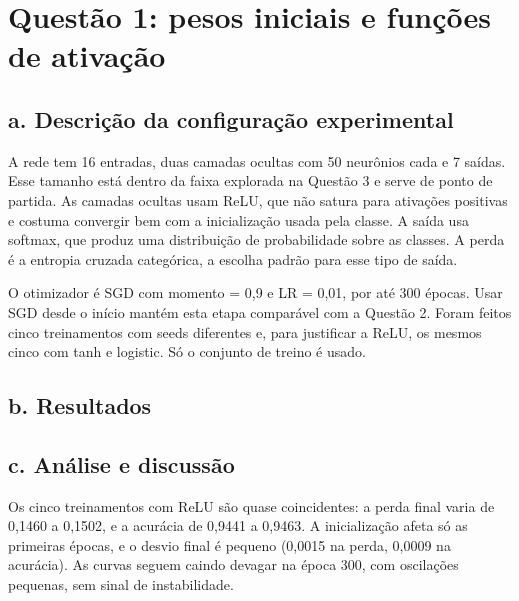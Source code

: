 \section{Questão 1: pesos iniciais e funções de ativação}

\subsection*{a. Descrição da configuração experimental}

A rede tem 16 entradas, duas camadas ocultas com 50 neurônios cada e 7 saídas. Esse tamanho está dentro da faixa
explorada na Questão 3 e serve de ponto de partida. As camadas ocultas usam ReLU, que não satura para ativações positivas
e costuma convergir bem com a inicialização usada pela classe. A saída usa softmax, que produz uma distribuição de
probabilidade sobre as classes. A perda é a entropia cruzada categórica, a escolha padrão para esse tipo de saída.

O otimizador é SGD com momento = 0,9 e LR = 0,01, por até 300 épocas. Usar SGD desde o início mantém esta etapa comparável
com a Questão 2. Foram feitos cinco treinamentos com seeds diferentes e, para justificar a ReLU, os mesmos cinco com tanh e
logistic. Só o conjunto de treino é usado.

\subsection*{b. Resultados}


\subsection*{c. Análise e discussão}

Os cinco treinamentos com ReLU são quase coincidentes: a perda final varia de 0,1460 a 0,1502, e a acurácia de 0,9441 a
0,9463. A inicialização afeta só as primeiras épocas, e o desvio final é pequeno (0,0015 na perda, 0,0009 na acurácia).
As curvas seguem caindo devagar na época 300, com oscilações pequenas, sem sinal de instabilidade.

